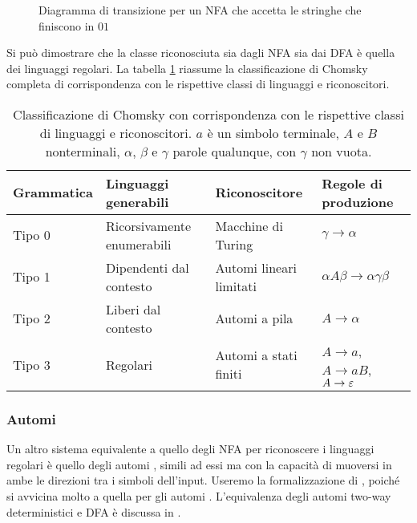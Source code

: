 \begin{figure}
	\centering
	
	\caption{Diagramma di transizione per un NFA che accetta le stringhe che finiscono in $01$}
\end{figure}

Si può dimostrare che la classe riconosciuta sia dagli NFA sia dai DFA è quella dei linguaggi regolari. La tabella \ref{tab:prel:chomskyhier} riassume la classificazione di Chomsky completa di corrispondenza con le rispettive classi di linguaggi e riconoscitori.

\begin{table}
	\caption{Classificazione di Chomsky con corrispondenza con le rispettive classi di linguaggi e riconoscitori. $a$ è un simbolo terminale, $A$ e $B$ nonterminali, $\alpha$, $\beta$ e $\gamma$ parole qualunque, con $\gamma$ non vuota.}
	\label{tab:prel:chomskyhier}
	\centering
	\begin{tabularx}{\textwidth}{lXXl}
		\toprule
		\textbf{Grammatica} & \textbf{Linguaggi generabili} & \textbf{Riconoscitore}  & \textbf{Regole di produzione}         \\
		\midrule
		Tipo 0              & Ricorsivamente enumerabili    & Macchine di Turing      & $\gamma\to\alpha$                     \\
		Tipo 1              & Dipendenti dal contesto       & Automi lineari limitati & $\alpha A\beta\to\alpha\gamma\beta$   \\
		Tipo 2              & Liberi dal contesto           & Automi a pila           & $A\to\alpha$                          \\
		Tipo 3              & Regolari                      & Automi a stati finiti   & $A\to a$, $A\to aB$, $A\to\varepsilon$ \\
		\bottomrule
	\end{tabularx}
\end{table}

\subsubsection{Automi }
Un altro sistema equivalente a quello degli NFA per riconoscere i linguaggi regolari è quello degli automi , simili ad essi ma con la capacità di muoversi in ambe le direzioni tra i simboli dell'input. Useremo la formalizzazione di \cite{Pighizzini:14:limitedRE}, poiché si avvicina molto a quella per gli automi . L'equivalenza degli automi two-way deterministici e DFA è discussa in \cite{Shallit:09:secondLFA}.

